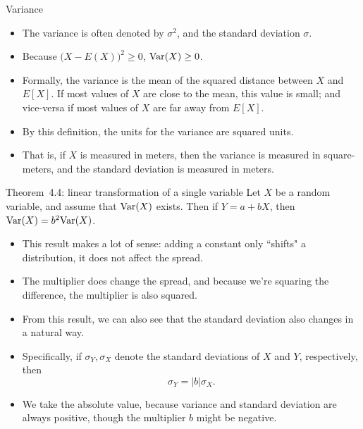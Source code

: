 \begin{frame}[allowframebreaks]{Variance}
  \begin{itemize}
    \item The variance is often denoted by $\sigma^2$, and the standard deviation $\sigma$.
    \item Because $\big(X - E(X)\big)^2 \geq 0$, $\mathrm{Var}(X) \geq 0$.
    \item Formally, the variance is the mean of the squared distance between $X$ and $E[X]$. If most values of $X$ are close to the mean, this value is small; and vice-versa if most values of $X$ are far away from $E[X]$.
    \item By this definition, the units for the variance are squared units. 
    \item That is, if $X$ is measured in meters, then the variance is measured in square-meters, and the standard deviation is measured in meters. 
  \end{itemize}
  
  \framebreak
  
  \begin{block}{Theorem~4.4: linear transformation of a single variable}
    Let $X$ be a random variable, and assume that $\mathrm{Var}(X)$ exists. Then if $Y = a + bX$, then $\mathrm{Var}(X) = b^2\mathrm{Var}(X)$.
    
  \end{block}
  
  
  \framebreak
  
  \begin{itemize}
    \item This result makes a lot of sense: adding a constant only ``shifts" a distribution, it does not affect the spread.
    \item The multiplier does change the spread, and because we're squaring the difference, the multiplier is also squared.
    \item From this result, we can also see that the standard deviation also changes in a natural way. 
    \item Specifically, if $\sigma_Y, \sigma_X$ denote the standard deviations of $X$ and $Y$, respectively, then
    $$
    \sigma_Y = |b|\sigma_X.
    $$
    \item We take the absolute value, because variance and standard deviation are always positive, though the multiplier $b$ might be negative.
  \end{itemize}
  

\end{frame}
